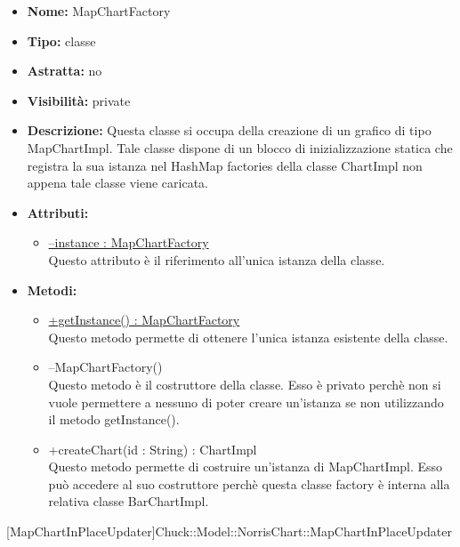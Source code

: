 			
			\begin{itemize}
			\item \textbf{Nome:} MapChartFactory
			\item \textbf{Tipo:} classe
			
		\item \textbf{Astratta:}
		no
			\item \textbf{Visibilità:} private
			\item \textbf{Descrizione:} Questa classe si occupa della creazione di un grafico di tipo MapChartImpl. Tale classe dispone di un blocco di inizializzazione statica che registra la sua istanza nel HashMap factories della classe ChartImpl non appena tale classe viene caricata.
			\item \textbf{Attributi:}
				\begin{itemize}
				\setlength{\itemsep}{5pt}
				
					\item[\ding{111}] \underline{--instance : MapChartFactory} \\ [1mm] Questo attributo è il riferimento all'unica istanza della classe.
				\end{itemize}
		
			\item \textbf{Metodi:}
				\begin{itemize}
				\setlength{\itemsep}{5pt}
				
					\item[\ding{111}] {\underline{+getInstance() : MapChartFactory}} \\ [1mm] Questo metodo permette di ottenere l'unica istanza esistente della classe.
					\item[\ding{111}] {{--MapChartFactory()}} \\ [1mm] Questo metodo è il costruttore della classe. Esso è privato perchè non si vuole permettere a nessuno di poter creare un’istanza se non utilizzando il metodo getInstance().
					\item[\ding{111}] {{+createChart(id : String) : ChartImpl}} \\ [1mm] Questo metodo permette di costruire un'istanza di MapChartImpl. Esso può accedere al suo costruttore perchè questa classe factory è interna alla relativa classe BarChartImpl.
				\end{itemize}
		
			\end{itemize}

			
			[MapChartInPlaceUpdater]{Chuck::Model::NorrisChart::MapChartInPlaceUpdater}
			

